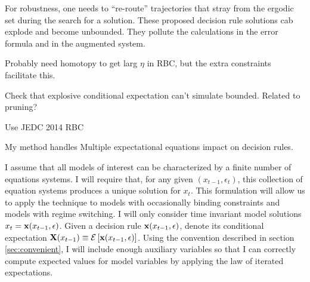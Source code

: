 \documentclass[12pt]{article}
\begin{document}



{\color{blue}
For robustness, one needs to ``re-route'' trajectories that stray from the
ergodic set during the search for a solution.  These proposed decision rule
solutions 
cab explode and become unbounded.  They pollute the calculations in the
error formula and in the augmented system.

Probably need homotopy to get larg $\eta$ in RBC, but the extra constraints
facilitate this.

Check that explosive conditional expectation can't simulate bounded.
Related to pruning?

Use  JEDC 2014 RBC 


My method handles Multiple expectational equations  impact on decision rules.
}


I assume that all models of interest can be characterized by
 a finite number of equations systems.
I will require that, for any 
 given $(x_{t-1},\epsilon_t)$,  this collection of 
equation systems  produces a unique solution for $x_t$.  
This formulation will allow us to apply the technique to models with
occasionally binding  constraints and models with regime switching.
I will only consider time invariant model solutions $x_t=\mathbf{x}(x_{t-1},\epsilon)$.  Given a decision rule $\mathbf{x}(x_{t-1},\epsilon)$, denote its conditional expectation $\mathbf{X}(x_{t-1})\equiv {\mathcal{E}\left [  \mathbf{x}(x_{t-1},\epsilon)\right ]}$.
Using the convention described in section \ref{sec:convenient}, 
 I will include 
enough auxiliary variables so that I can correctly compute expected values
for model variables by applying the law of iterated 
expectations.
\end{document}

